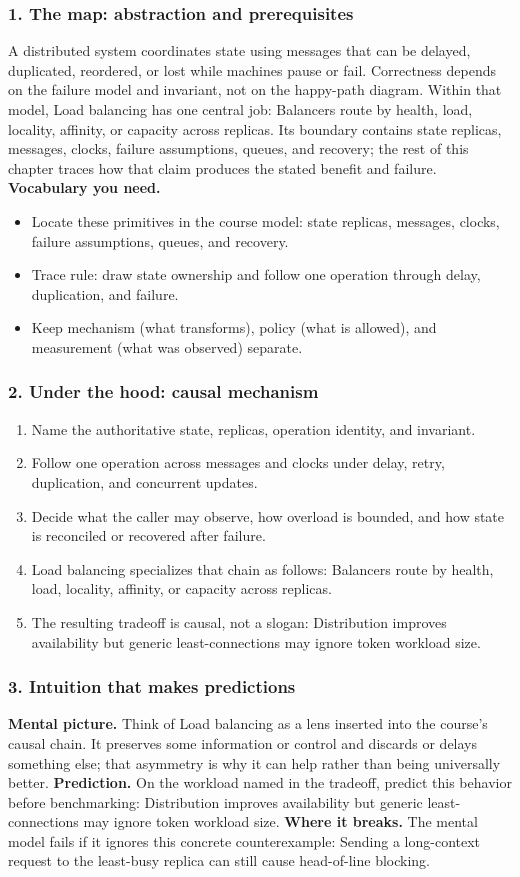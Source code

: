 \subsubsection*{1. The map: abstraction and prerequisites}
A distributed system coordinates state using messages that can be delayed, duplicated, reordered, or lost while machines pause or fail. Correctness depends on the failure model and invariant, not on the happy-path diagram.
Within that model, Load balancing has one central job: Balancers route by health, load, locality, affinity, or capacity across replicas. Its boundary contains state replicas, messages, clocks, failure assumptions, queues, and recovery; the rest of this chapter traces how that claim produces the stated benefit and failure.
\textbf{Vocabulary you need.}\begin{itemize}
\item Locate these primitives in the course model: state replicas, messages, clocks, failure assumptions, queues, and recovery.
\item Trace rule: draw state ownership and follow one operation through delay, duplication, and failure.
\item Keep mechanism (what transforms), policy (what is allowed), and measurement (what was observed) separate.
\end{itemize}
\subsubsection*{2. Under the hood: causal mechanism}\begin{enumerate}
\item Name the authoritative state, replicas, operation identity, and invariant.
\item Follow one operation across messages and clocks under delay, retry, duplication, and concurrent updates.
\item Decide what the caller may observe, how overload is bounded, and how state is reconciled or recovered after failure.
\item Load balancing specializes that chain as follows: Balancers route by health, load, locality, affinity, or capacity across replicas.
\item The resulting tradeoff is causal, not a slogan: Distribution improves availability but generic least-connections may ignore token workload size.
\end{enumerate}
\subsubsection*{3. Intuition that makes predictions}
\textbf{Mental picture.} Think of Load balancing as a lens inserted into the course's causal chain. It preserves some information or control and discards or delays something else; that asymmetry is why it can help rather than being universally better.
\textbf{Prediction.} On the workload named in the tradeoff, predict this behavior before benchmarking: Distribution improves availability but generic least-connections may ignore token workload size.
\textbf{Where it breaks.} The mental model fails if it ignores this concrete counterexample: Sending a long-context request to the least-busy replica can still cause head-of-line blocking.
